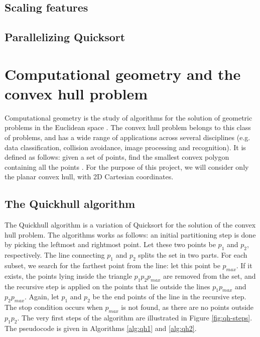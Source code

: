 \documentclass[]{finalproject}
\begin{document}
\subsection{Scaling features}
\subsection{Parallelizing Quicksort}

\section{Computational geometry and the convex hull problem}
Computational geometry is the study of algorithms for the solution of geometric problems in the Euclidean space \cite{paper}.
The convex hull problem belongs to this class of problems, and has a wide range of applications across several disciplines
(e.g. data classification, collision avoidance, image processing and recognition). It is defined as follows:
given a set of points, find the smallest convex polygon containing all the points \cite{geowiki}.
For the purpose of this project, we will consider only the planar convex hull, with 2D Cartesian coordinates.

\subsection{The Quickhull algorithm}
The Quickhull algorithm is a variation of Quicksort for the solution of the convex hull problem.
The algorithms works as follows:
an initial partitioning step is done by picking the leftmost and rightmost point.
Let these two points be $p_1$ and $p_2$, respectively.
The line connecting $p_1$ and $p_2$ splits the set in two parts.
For each subset, we search for the farthest point from the line: let this point be $p_{max}$.
If it exists, the points lying inside the triangle $p_1p_2p_{max}$ are removed from the set,
and the recursive step is applied on the points that lie outside the lines $p_1p_{max}$ and $p_2p_{max}$.
Again, let $p_1$ and $p_2$ be the end points of the line in the recursive step.
The stop condition occurs when $p_{max}$ is not found, as there are no points outside $p_1p_2$.
The very first steps of the algorithm are illustrated in Figure \ref{fig:qh-steps}.
The pseudocode is given in Algorithms \ref{alg:qh1} and \ref{alg:qh2}.
\end{document}
